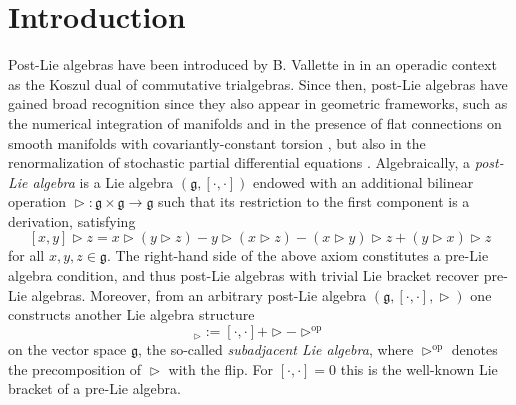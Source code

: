 \documentclass[10pt]{article}
\theoremstyle{definition}
\newcommand{\wt}{\vartriangleright}
\begin{document}
\section*{Introduction}
Post-Lie algebras have been introduced by B. Vallette in \cite{Vallette} in an operadic context as the Koszul dual of commutative trialgebras. Since then, post-Lie algebras have gained broad recognition since they also appear in geometric frameworks, such as the numerical integration of manifolds \cite{CE-FM-K} and in the presence of flat connections on smooth manifolds with covariantly-constant torsion \cite{ML}, but also in the renormalization of stochastic partial differential equations \cite{BST}. Algebraically, a \emph{post-Lie algebra} is a Lie algebra $(\mathfrak{g},[\cdot,\cdot])$ endowed with an additional bilinear operation $\wt\colon\mathfrak{g}\times\mathfrak{g}\to\mathfrak{g}$ such that its restriction to the first component is a derivation, satisfying
$$
[x,y] \wt z = x \wt (y \wt z) - y \wt (x \wt z) - (x \wt y) \wt z + (y \wt x) \wt z
$$
for all $x,y,z\in\mathfrak{g}$. The right-hand side of the above axiom constitutes a pre-Lie algebra condition, and thus post-Lie algebras with trivial Lie bracket recover pre-Lie algebras. Moreover, from an arbitrary post-Lie algebra $(\mathfrak{g},[\cdot,\cdot],\wt)$ one constructs another Lie algebra structure
	\begin{equation}
		[\cdot,\cdot]_{\wt}:=[\cdot,\cdot]+\wt-\wt^\mathrm{op}
	\end{equation}
on the vector space $\mathfrak{g}$, the so-called \emph{subadjacent Lie algebra}, where $\wt^\mathrm{op}$ denotes the precomposition of $\wt$ with the flip. For $[\cdot,\cdot]=0$ this is the well-known Lie bracket of a pre-Lie algebra.
\end{document}
